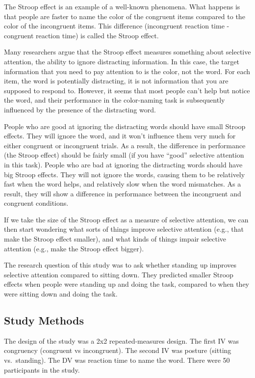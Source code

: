 \documentclass[]{book}
\begin{document}
The Stroop effect is an example of a well-known phenomena. What happens
is that people are faster to name the color of the congruent items
compared to the color of the incongruent items. This difference
(incongruent reaction time - congruent reaction time) is called the
Stroop effect.

Many researchers argue that the Stroop effect measures something about
selective attention, the ability to ignore distracting information. In
this case, the target information that you need to pay attention to is
the color, not the word. For each item, the word is potentially
distracting, it is not information that you are supposed to respond to.
However, it seems that most people can't help but notice the word, and
their performance in the color-naming task is subsequently influenced by
the presence of the distracting word.

People who are good at ignoring the distracting words should have small
Stroop effects. They will ignore the word, and it won't influence them
very much for either congruent or incongruent trials. As a result, the
difference in performance (the Stroop effect) should be fairly small (if
you have ``good'' selective attention in this task). People who are bad
at ignoring the distracting words should have big Stroop effects. They
will not ignore the words, causing them to be relatively fast when the
word helps, and relatively slow when the word mismatches. As a result,
they will show a difference in performance between the incongruent and
congruent conditions.

If we take the size of the Stroop effect as a measure of selective
attention, we can then start wondering what sorts of things improve
selective attention (e.g., that make the Stroop effect smaller), and
what kinds of things impair selective attention (e.g., make the Stroop
effect bigger).

The research question of this study was to ask whether standing up
improves selective attention compared to sitting down. They predicted
smaller Stroop effects when people were standing up and doing the task,
compared to when they were sitting down and doing the task.

\subsection{Study Methods}\label{study-methods-2}

The design of the study was a 2x2 repeated-measures design. The first IV
was congruency (congruent vs incongruent). The second IV was posture
(sitting vs.~standing). The DV was reaction time to name the word. There
were 50 participants in the study.
\end{document}
